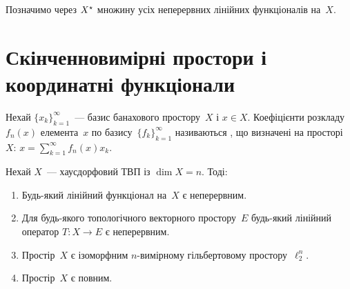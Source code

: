 Позначимо через $X^\star$ множину усіх неперервних лінійних функціоналів на~$X$.

\section{Скінченновимірні простори і координатні функціонали}

\begin{definition}
    Нехай $\{x_k\}_{k = 1}^\infty$~--- базис банахового простору~$X$ і $x \in X$. Коефіцієнти розкладу $f_n(x)$ елемента~$x$ по базису~$\{f_k\}_{k = 1}^\infty$ називаються , що визначені на просторі~$X$: $x = \sum_{k = 1}^\infty f_n(x) x_k$.
\end{definition}

\begin{theorem}
    \label{th:finite-dimensional-hausdorff-tvs-properties}
    Нехай $X$~--- хаусдорфовий ТВП із $\dim X = n$. Тоді:
    \begin{enumerate}
        \item Будь-який лінійний функціонал на~$X$ є неперервним.
        \item Для будь-якого топологічного векторного простору~$E$ будь-який лінійний оператор $T: X \to E$ є неперервним.
        \item Простір~$X$ є ізоморфним $n$-вимірному гільбертовому простору~$\ell_2^n$.
        \item Простір~$X$ є повним.
    \end{enumerate}
\end{theorem}

